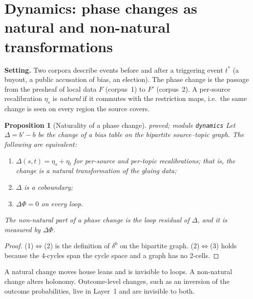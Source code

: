 \documentclass[11pt]{article}
\newtheorem{proposition}[theorem]{Proposition}
\theoremstyle{definition}
\theoremstyle{remark}
\newcommand{\st}[1]{\textsf{\small\color{gray}#1}}
\begin{document}
\section{Dynamics: phase changes as natural and non-natural transformations}\label{sec:dynamics}
\textbf{Setting.} Two corpora describe events before and after a triggering event $t^*$ (a buyout, a public accusation of bias, an election). The phase change is the passage from the presheaf of local data $F$ (corpus~1) to $F'$ (corpus~2). A per-source recalibration $\eta_s$ is \emph{natural} if it commutes with the restriction maps, i.e.\ the same change is seen on every region the source covers.
\begin{proposition}[Naturality of a phase change]\label{prop:natural}\st{proved; module \texttt{dynamics}}
Let $\Delta=b'-b$ be the change of a bias table on the bipartite source--topic graph. The following are equivalent:
\begin{enumerate}
  \item $\Delta(s,t)=\eta_s+\eta_t$ for per-source and per-topic recalibrations; that is, the change is a natural transformation of the gluing data;
  \item $\Delta$ is a coboundary;
  \item $\Delta\Phi=0$ on every loop.
\end{enumerate}
The non-natural part of a phase change is the loop residual of $\Delta$, and it is measured by $\Delta\Phi$.
\end{proposition}
\begin{proof}
(1)$\Leftrightarrow$(2) is the definition of $\delta^0$ on the bipartite graph. (2)$\Leftrightarrow$(3) holds because the 4-cycles span the cycle space and a graph has no 2-cells.
\end{proof}
A natural change moves house leans and is invisible to loops. A non-natural change alters holonomy. Outcome-level changes, such as an inversion of the outcome probabilities, live in Layer~1 and are invisible to both.
\end{document}
